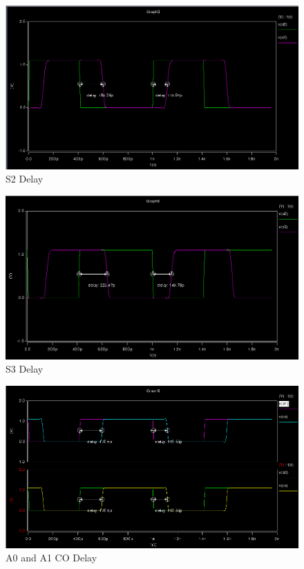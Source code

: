 \documentclass[12pt]{article}
\begin{document}
\begin{figure}[H]
\centering
\includegraphics[width=\linewidth]{a2}
\caption{S2 Delay}
\label{fig:a2}
\end{figure}


\begin{figure}[H]
\centering
\includegraphics[width=\linewidth]{a3}
\caption{S3 Delay}
\label{fig:a3}
\end{figure}


\begin{figure}[H]
\centering
\includegraphics[width=\linewidth]{a1-co}
\caption{A0 and A1 CO Delay}
\label{fig:a1-co}
\end{figure}
\end{document}
